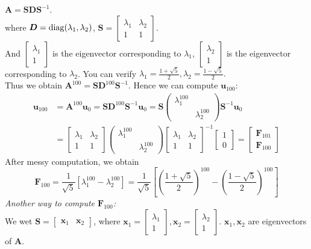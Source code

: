 $
\bm A=\bm S\bm D\bm S^{-1}.
$\\
where $\bm D=\operatorname{diag}(\lambda_1,\lambda_2)$, $\bm S=\begin{bmatrix}
\lambda_1&\lambda_2\\1&1
\end{bmatrix}.$\\
And $\begin{bmatrix}
\lambda_1\\1
\end{bmatrix}$ is the eigenvector corresponding to $\lambda_1$, $\begin{bmatrix}
\lambda_2\\1
\end{bmatrix}$ is the eigenvector corresponding to $\lambda_2$. You can verify $\lambda_1=\frac{1+\sqrt{5}}{2},\lambda_2=\frac{1-\sqrt{5}}{2}.$\\
Thus we obtain $\bm A^{100}=\bm S\bm D^{100}\bm S^{-1}$. Hence we can compute $\bm u_{100}$:
\begin{align*}
\bm u_{100}&=\bm A^{100}\bm u_0=\bm S\bm D^{100}\bm S^{-1}\bm u_0=\bm S\begin{pmatrix}
\lambda_1^{100}&\\&\lambda_2^{100}
\end{pmatrix}\bm S^{-1}\bm u_0
\\&=\begin{bmatrix}
\lambda_1&\lambda_2\\1&1
\end{bmatrix}\begin{pmatrix}
\lambda_1^{100}&\\&\lambda_2^{100}
\end{pmatrix}\begin{bmatrix}
\lambda_1&\lambda_2\\1&1
\end{bmatrix}^{-1}\begin{bmatrix}
1\\0
\end{bmatrix}=\begin{bmatrix}
\bm F_{101}\\\bm F_{100}
\end{bmatrix}
\end{align*}
After messy computation, we obtain 
\[
\bm F_{100}=\frac{1}{\sqrt{5}}\left[\lambda_1^{100}-\lambda_2^{100}\right]
=\frac{1}{\sqrt{5}}\left[\left(\frac{1+\sqrt{5}}{2}\right)^{100}-\left(\frac{1-\sqrt{5}}{2}\right)^{100}\right]
\]
\emph{Another way to compute $\bm F_{100}$:}\\
We wet $\bm S=\begin{bmatrix}
\bm x_1&\bm x_2
\end{bmatrix}$, where $\bm x_1=\begin{bmatrix}
\lambda_1\\1
\end{bmatrix},\bm x_2=\begin{bmatrix}
\lambda_2\\1
\end{bmatrix}.$ $\bm x_1,\bm x_2$ are eigenvectors of $\bm A$.\\
